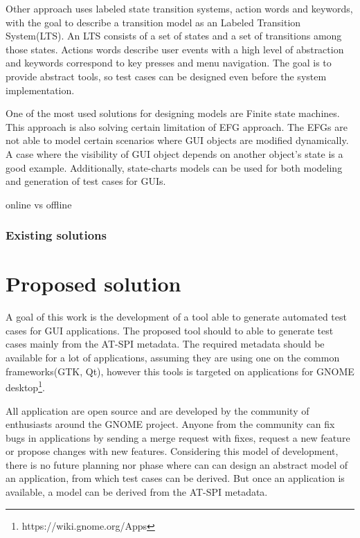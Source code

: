 Other approach uses labeled state transition systems, action words and keywords, with the goal to describe a transition model as an Labeled Transition System(LTS). An LTS consists of a set of states and a set of transitions among those states. Actions words describe user events with a high level of abstraction and keywords correspond to key presses and menu navigation. The goal is to provide abstract tools, so test cases can be designed even before the system implementation. 

One of the most used solutions for designing models are Finite state machines. This approach is also solving certain limitation of EFG approach. The EFGs are not able to model certain scenarios where GUI objects are modified dynamically. A case where the visibility of GUI object depends on another object's state is a good example. Additionally, state-charts models can be used for both modeling and generation of test cases for GUIs.\cite{patternbasedtesting}

online vs offline

\subsection{Existing solutions}




\cite{embedded}

\chapter{Proposed solution}
A goal of this work is the development of a tool able to generate automated test cases for GUI applications. The proposed tool should to able to generate test cases mainly from the AT-SPI metadata. The required metadata should be available for a lot of applications, assuming they are using one on the common frameworks(GTK, Qt), however this tools is targeted on applications for GNOME desktop\footnote{https://wiki.gnome.org/Apps}. 

All application are open source and are developed by the community of enthusiasts around the GNOME project. Anyone from the community can fix bugs in applications by sending a merge request with fixes, request a new feature or propose changes with new features. Considering this model of development, there is no future planning nor phase where can can design an abstract model of an application, from which test cases can be derived. But once an application is available, a model can be derived from the AT-SPI metadata. 


